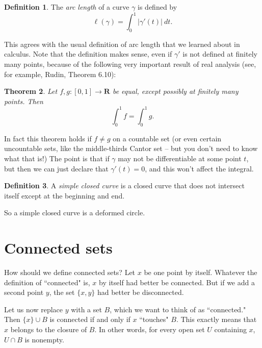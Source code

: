 \documentclass[12pt]{report}
\newcommand{\RR}{\mathbf{R}}
\newcommand{\dfn}[1]{\emph{#1}\index{#1}}
\newtheorem{theorem}{Theorem}[chapter]
\theoremstyle{definition}
\newtheorem{definition}[theorem]{Definition}
\theoremstyle{remark}
\begin{document}
\begin{definition}
The \dfn{arc length} of a curve $\gamma$ is defined by
$$\ell(\gamma) = \int_0^1 |\gamma'(t)| ~dt.$$
\end{definition}
This agrees with the usual definition of arc length that we learned about in calculus. Note that the definition makes sense, even if $\gamma'$ is not defined at finitely many points, because of the following very important result of real analysis (see, for example, Rudin, Theorem 6.10):
\begin{theorem}
Let $f,g: [0, 1] \to \RR$ be equal, except possibly at finitely many points. Then
$$\int_0^1 f = \int_0^1 g.$$
\end{theorem}
In fact this theorem holds if $f \neq g$ on a countable set (or even certain uncountable sets, like the middle-thirds Cantor set -- but you don't need to know what that is!) The point is that if $\gamma$ may not be differentiable at some point $t$, but then we can just declare that $\gamma'(t) = 0$, and this won't affect the integral.
\
\begin{definition}
A \dfn{simple closed curve} is a closed curve that does not intersect itself except at the beginning and end.
\end{definition}
So a simple closed curve is a deformed circle.


\section{Connected sets}
How should we define connected sets? Let $x$ be one point by itself. Whatever the definition of ``connected" is, $x$ by itself had better be connected. But if we add a second point $y$, the set $\{x, y\}$ had better be disconnected.

Let us now replace $y$ with a set $B$, which we want to think of as ``connected." Then $\{x\} \cup B$ is connected if and only if $x$ ``touches" $B$. This exactly means that $x$ belongs to the closure of $B$. In other words, for every open set $U$ containing $x$, $U \cap B$ is nonempty.
\end{document}
